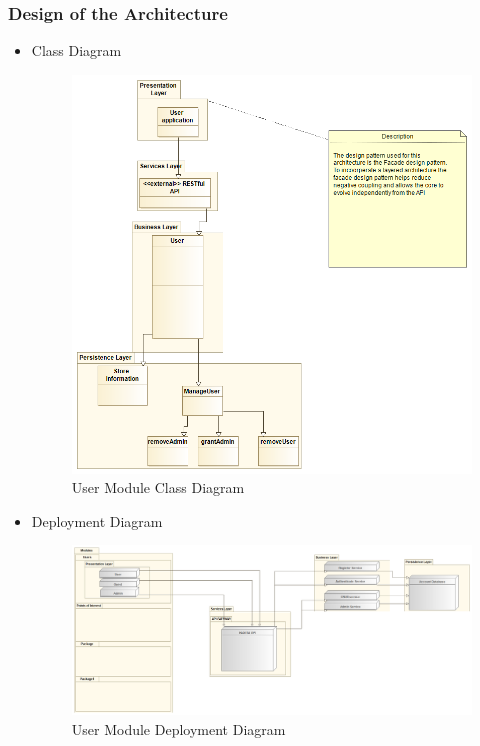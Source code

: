 \documentclass{article}
\begin{document}
	\subsubsection{Design of the Architecture}
		\begin{itemize}
 				\item Class Diagram
 				\begin{center}
					\begin{figure}[!h]
					\includegraphics[scale=0.5]{cdu.png}
					\caption{User Module Class Diagram}
					\end{figure}
				\end{center}
	 			\clearpage
	 			
	 			\item Deployment Diagram				
	 			\begin{center}
	 				\begin{figure}[!h]
	 					\includegraphics[scale=0.3]{dd.png}
	 					\caption{User Module Deployment Diagram}
	 				\end{figure}
	 			\end{center}
	 			

\end{itemize}
\end{document}
